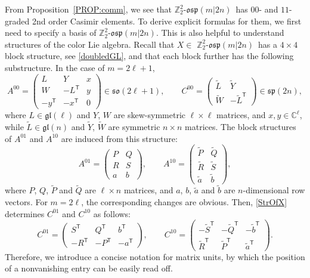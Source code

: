 \documentclass[pdftex]{sigma}
\numberwithin{equation}{section}
\theoremstyle{definition}
\def\Z2{\mathbb{Z}_2^2}
\def\osp{\mathfrak{osp}}
\def\gl{\mathfrak{gl}}
\def\so{\mathfrak{so}}
\def\sp{\mathfrak{sp}}
\def\Zosp{$\Z2$-$\osp(m|2n)$}
\begin{document}
From Proposition~\ref{PROP:comm}, we see that \Zosp\ has $00$- and $11$-graded 2nd order Casimir elements.
To derive explicit formulas for them, we first need to specify a basis of \Zosp.
This is also helpful to understand structures of the color Lie algebra.
Recall that $ X \in $ \Zosp\ has a $ 4 \times 4 $ block structure, see \eqref{doubledGL}, and that each block further has the following substructure.
In the case of $ m = 2\ell+1$,
\begin{equation*}
	A^{00} =
	\begin{pmatrix}
		L & Y & x
		\\
		W & -L^{\mathsf{T}} & y
		\\
		-y^{\mathsf{T}} & -x^{\mathsf{T}} & 0
	\end{pmatrix}
	\in \so(2\ell+1), \qquad
	C^{00} =
	\begin{pmatrix}
		\tilde{L} & \tilde{Y} \\ \tilde{W} & -\tilde{L}^{\mathsf{T}}
	\end{pmatrix}
	\in \sp(2n),
\end{equation*}
where $ L \in \gl(\ell)$ and $ Y$, $W $ are skew-symmetric $\ell \times \ell $ matrices, and $ x, y \in \mathbb{C}^{\ell}$,
while $\tilde{L} \in \gl(n)$ and $ \tilde{Y}$, $\tilde{W}$ are symmetric $ n \times n $ matrices.
The block structures of $A^{01}$ and $A^{10}$ are induced from this structure:
\begin{equation*}
	A^{01} =
	\begin{pmatrix}
		P & Q \\ R & S \\
		a & b
	\end{pmatrix},
	\qquad
	A^{10} =
	\begin{pmatrix}
		\tilde{P} & \tilde{Q} \\ \tilde{R} & \tilde{S} \\
		\tilde{a} & \tilde{b}
	\end{pmatrix},
\end{equation*}
where $ P$, $Q$, $\tilde{P}$ and $\tilde{Q} $ are $ \ell \times n $ matrices, and $ a$, $b$, $\tilde{a} $ and $\tilde{b} $ are $n$-dimensional row vectors.
For $m = 2\ell$, the corresponding changes are obvious.
Then, \eqref{StrOfX} determines $ C^{01}$ and $ C^{10}$ as follows:%
\begin{equation*}
	C^{01}
	=
	\begin{pmatrix}
		S^{\mathsf{T}} & Q^{\mathsf{T}} & b^{\mathsf{T}} \\
		-R^{\mathsf{T}} & -P^{\mathsf{T}} & -a^{\mathsf{T}}
	\end{pmatrix},
	\qquad
	C^{10} =
	\begin{pmatrix}
		-\tilde{S}^{\mathsf{T}} & - \tilde{Q}^{\mathsf{T}} & -\tilde{b}^{\mathsf{T}}
		\\
		\tilde{R}^{\mathsf{T}} & \tilde{P}^{\mathsf{T}} & \tilde{a}^{\mathsf{T}}
	\end{pmatrix}.
\end{equation*}
Therefore, we introduce a concise notation for matrix units, by which the position of a nonvanishing entry can be easily read off.
\end{document}
